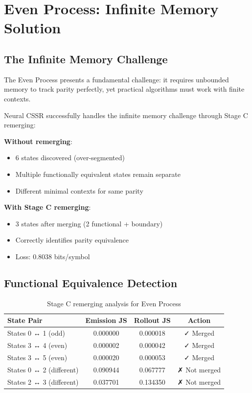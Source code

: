 \documentclass[11pt,a4paper]{report}
\theoremstyle{definition}
\begin{document}
\section{Even Process: Infinite Memory Solution}
\label{sec:even-results}

\subsection{The Infinite Memory Challenge}

The Even Process presents a fundamental challenge: it requires unbounded memory to track parity perfectly, yet practical algorithms must work with finite contexts.

\begin{resultbox}
Neural CSSR successfully handles the infinite memory challenge through Stage C remerging:

\textbf{Without remerging}:
\begin{itemize}
    \item 6 states discovered (over-segmented)
    \item Multiple functionally equivalent states remain separate
    \item Different minimal contexts for same parity
\end{itemize}

\textbf{With Stage C remerging}:
\begin{itemize}
    \item 3 states after merging (2 functional + boundary)
    \item Correctly identifies parity equivalence
    \item Loss: 0.8038 bits/symbol
\end{itemize}
\end{resultbox}

\subsection{Functional Equivalence Detection}

\begin{table}[htbp]
\centering
\caption{Stage C remerging analysis for Even Process}
\label{tab:even-remerging}
\begin{tabular}{@{}lccc@{}}
\toprule
\textbf{State Pair} & \textbf{Emission JS} & \textbf{Rollout JS} & \textbf{Action} \\
\midrule
\rowcolor{highlightgreen}
States 0 ↔ 1 (odd) & 0.000000 & 0.000018 & ✓ Merged \\
\rowcolor{highlightgreen}
States 3 ↔ 4 (even) & 0.000002 & 0.000042 & ✓ Merged \\
\rowcolor{highlightgreen}
States 3 ↔ 5 (even) & 0.000020 & 0.000053 & ✓ Merged \\
\rowcolor{highlightred}
States 0 ↔ 2 (different) & 0.090944 & 0.067777 & ✗ Not merged \\
\rowcolor{highlightred}
States 2 ↔ 3 (different) & 0.037701 & 0.134350 & ✗ Not merged \\
\bottomrule
\end{tabular}
\end{table}
\end{document}
